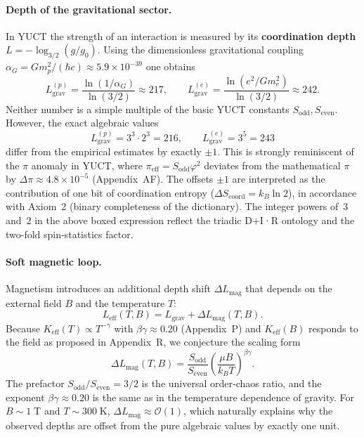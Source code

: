 \documentclass[12pt]{article}
\theoremstyle{remark}
\begin{document}
	\paragraph{Depth of the gravitational sector.}
	In YUCT the strength of an interaction is measured by its \textbf{coordination depth}
	$L = -\log_{3/2}(g/g_0)$.  Using the dimensionless gravitational coupling
	$\alpha_G = G m_p^2/(\hbar c) \approx 5.9\times 10^{-39}$ one obtains
	\begin{equation}
		L_{\mathrm{grav}}^{(p)} = \frac{\ln(1/\alpha_G)}{\ln(3/2)} \approx 217,
		\qquad
		L_{\mathrm{grav}}^{(e)} = \frac{\ln(e^2/G m_e^2)}{\ln(3/2)} \approx 242.
	\end{equation}
	Neither number is a simple multiple of the basic YUCT constants $S_{\mathrm{odd}}, S_{\mathrm{even}}$.
	However, the exact algebraic values
	\begin{equation}
		\boxed{L_{\mathrm{grav}}^{(p)} = 3^3 \cdot 2^3 = 216},
		\qquad
		\boxed{L_{\mathrm{grav}}^{(e)} = 3^5 = 243}
	\end{equation}
	differ from the empirical estimates by exactly $\pm1$.  
	This is strongly reminiscent of the $\pi$ anomaly in YUCT, where
	$\pi_{\mathrm{eff}} = S_{\mathrm{odd}}\varphi^2$ deviates from the mathematical $\pi$ by
	$\Delta\pi \approx 4.8\times10^{-5}$ (Appendix~AF).  
	The offsets $\pm1$ are interpreted as the contribution of one bit of coordination entropy
	($\Delta S_{\mathrm{coord}} = k_B \ln 2$), in accordance with Axiom~2 (binary completeness
	of the dictionary).  The integer powers of~3 and~2 in the above boxed expression reflect the
	triadic D+I·R ontology and the two-fold spin‑statistics factor.
	
	\paragraph{Soft magnetic loop.}
	Magnetism introduces an additional depth shift $\Delta L_{\mathrm{mag}}$ that depends
	on the external field $B$ and the temperature $T$:
	\begin{equation}
		L_{\mathrm{eff}}(T,B) = L_{\mathrm{grav}} + \Delta L_{\mathrm{mag}}(T,B).
	\end{equation}
	Because $K_{\mathrm{eff}}(T) \propto T^{-\gamma}$ with $\beta\gamma \approx 0.20$
	(Appendix~P) and $K_{\mathrm{eff}}(B)$ responds to the field as proposed in
	Appendix~R, we conjecture the scaling form
	\begin{equation}
		\boxed{
			\Delta L_{\mathrm{mag}}(T,B) =
			\frac{S_{\mathrm{odd}}}{S_{\mathrm{even}}}
			\left( \frac{\mu B}{k_B T} \right)^{\beta\gamma}
		}.
		\label{eq:soft-loop}
	\end{equation}
	The prefactor $S_{\mathrm{odd}}/S_{\mathrm{even}} = 3/2$ is the universal order‑chaos
	ratio, and the exponent $\beta\gamma \approx 0.20$ is the same as in the temperature
	dependence of gravity.  For $B \sim 1\;\mathrm{T}$ and $T \sim 300\;\mathrm{K}$,
	$\Delta L_{\mathrm{mag}} \approx \mathcal{O}(1)$, which naturally explains why the
	observed depths are offset from the pure algebraic values by exactly one unit.
	
\end{document}
